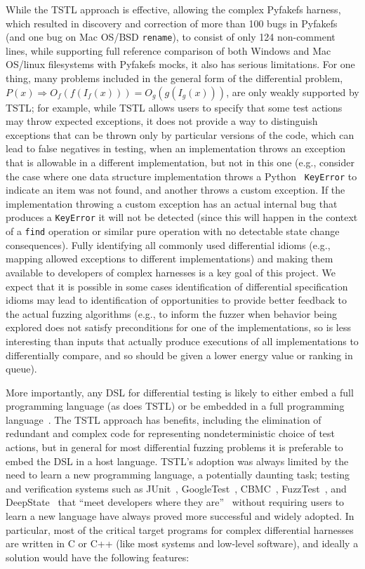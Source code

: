 While the TSTL approach is effective, allowing the complex Pyfakefs
harness, which resulted in discovery and correction of more than 100 bugs in Pyfakefs
(and one bug on Mac OS/BSD {\tt rename}), to consist of only 124
non-comment lines, while supporting full reference comparison of both
Windows and Mac OS/linux filesystems with Pyfakefs mocks, it
also has serious limitations.  For one thing, many problems included
in the general form of the differential problem, $P(x)
\Rightarrow O_f(f(I_f(x))) = O_g(g(I_g(x)))$, are only weakly
supported by TSTL; for example, while TSTL allows users to specify
that some test actions may throw expected exceptions, it does not
provide a way to distinguish exceptions that can be thrown only by
particular versions of the code, which can lead to false negatives in
testing, when an implementation throws an exception that is allowable
in a different implementation, but not in this one (e.g., consider the
case where one data structure implementation throws a Python {\tt
  KeyError} to indicate an item was not found, and another throws a
custom exception.  If the implementation throwing a custom exception
has an actual internal bug that produces a {\tt KeyError} it will not
be detected (since this will happen in the context of a {\tt find}
operation or similar pure operation with no detectable state change
consequences).  Fully identifying all commonly used differential
idioms (e.g., mapping allowed exceptions to different implementations)
and making them available to developers of complex harnesses is a key
goal of this project.  We expect that it is possible in some cases
identification of differential specification idioms may lead to
identification of opportunities to provide better feedback to the
actual fuzzing algorithms (e.g., to inform the fuzzer when behavior
being explored does not satisfy preconditions for one of the
implementations, so is less interesting than inputs that actually
produce executions of all implementations to differentially compare,
and so should be given a lower energy value or ranking in queue).

More importantly, any DSL for differential testing is
likely to either embed a full programming language (as does TSTL) or
be embedded in a full programming language~\cite{fowler2010domain}.
The TSTL approach has benefits, including the elimination of redundant
and complex code for representing nondeterministic choice of test
actions, but in general for most differential fuzzing problems it is
preferable to embed the DSL in a host language.   TSTL's adoption was
always limited by the need to learn a new programming language, a
potentially daunting task; testing and verification systems such as
JUnit~\cite{junit}, GoogleTest~\cite{GoogleTest}, CBMC~\cite{CBMC},
FuzzTest~\cite{FuzzTest}, and DeepState~\cite{DeepState} that ``meet
developers where they are''~\cite{meeting} without requiring users to
learn a new language have always proved more successful and widely adopted.
In particular, most
of the critical target programs for complex differential harnesses are
written in C or C++ (like most systems and low-level software), and
ideally a solution would have the following features:

